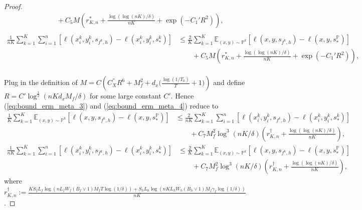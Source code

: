 \documentclass{article}
\numberwithin{equation}{section}
\def\eqref#1{equation~\ref{#1}}
\newcommand{\E}{\mathbb{E}}
\theoremstyle{definition}
\renewcommand{\P}{\mathbb{P}}
\renewcommand{\eqref}[1]{(\ref{#1})}
\begin{document}
\begin{proof}
\begin{equation}
\begin{aligned}
            &\qquad + C_5M\left(r_{K,n}^*+\frac{\log(\log(nK)/\delta)}{nK}+\exp(-C_1'R^2)\right), \\
        \end{aligned}
    \end{equation}
    \begin{equation}\label{eq:bound_erm_meta_4}
        \begin{aligned}
            \frac{1}{nK}\sum_{k=1}^K\sum_{i=1}^n [\ell(x_i^k,y_i^k,s_{f^k,h})-\ell(x_i^k,y_i^k,s_*^k)]
            &\leq \frac{2}{K}\sum_{k=1}^K\E_{(x,y)\sim\P^k} [\ell(x,y,s_{f^k,h})-\ell(x,y,s_*^\P)] \\
            &\qquad + C_5M\left(r_{K,n}^*+\frac{\log(\log(nK)/\delta)}{nK}+\exp(-C_1'R^2)\right), \\
        \end{aligned}
    \end{equation}
    
    Plug in the definition of $M=C\left(C_X^{''}R^6+M_f^2+d_x\Big(\frac{\log(1/T_0)}{T}+1\Big)\right)$ and define $R=C'\log^{\frac{1}{2}}(nKd_xM_f/\delta)$ for some large constant $C'$. Hence \eqref{eq:bound_erm_meta_3} and \eqref{eq:bound_erm_meta_4} reduce to
    \begin{equation}
        \begin{aligned}
            \frac{1}{K}\sum_{k=1}^K\E_{(x,y)\sim\P^k} [\ell(x,y,s_{f^k,h})-\ell(x,y,s_*^\P)]
            &\leq \frac{2}{nK}\sum_{k=1}^K\sum_{i=1}^n [\ell(x_i^k,y_i^k,s_{f^k,h})-\ell(x_i^k,y_i^k,s_*^k)] \\
            &\qquad + C_7M_f^2\log^3(nK/\delta)\left(r_{K,n}^\dagger+\frac{\log(\log(nK)/\delta)}{nK}\right),
        \end{aligned}
    \end{equation}
    \begin{equation}
        \begin{aligned}
            \frac{1}{nK}\sum_{k=1}^K\sum_{i=1}^n [\ell(x_i^k,y_i^k,s_{f^k,h})-\ell(x_i^k,y_i^k,s_*^k)]
            &\leq \frac{2}{K}\sum_{k=1}^K\E_{(x,y)\sim\P^k} [\ell(x,y,s_{f^k,h})-\ell(x,y,s_*^\P)] \\
            &\qquad + C_7M_f^2\log^3(nK/\delta)\left(r_{K,n}^\dagger+\frac{\log(\log(nK)/\delta)}{nK}\right),
        \end{aligned}
    \end{equation}
    where $r_{K,n}^\dagger:=\frac{KS_fL_f\log\left(nL_fW_f(B_f\vee 1)M_fT\log(1/\delta)\right)+S_hL_h\log\left(nKL_hW_h(B_h\vee 1)M_f\gamma_f\log(1/\delta)\right)}{nK}$.


\end{proof}
\end{document}
